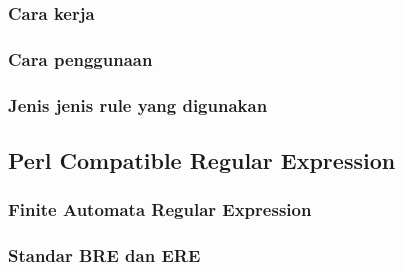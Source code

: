 \documentclass{report}
\begin{document}
\subsubsection{Cara kerja}

\subsubsection{Cara penggunaan}
\subsubsection{Jenis jenis rule yang digunakan}
\subsection{Perl Compatible Regular Expression}
\subsubsection{Finite Automata Regular Expression}
\subsubsection{Standar BRE dan ERE}
\end{document}
